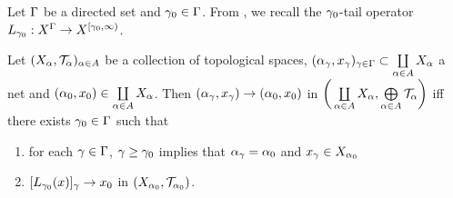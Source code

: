 \documentclass{book}
\begin{document}
	\begin{note}
		Let $\Gamma$ be a directed set and $\gamma_0 \in \Gamma$. From , we recall the $\gamma_0$-tail operator $L_{\gamma_0}: X^{\Gamma} \rightarrow X^{[\gamma_0, \infty)}$. 
	\end{note}

	\begin{ex} 
		Let $(X_{\alpha}, \mathcal{T}_{\alpha})_{\alpha \in A}$ be a collection of topological spaces, $(\alpha_{\gamma}, x_{\gamma})_{\gamma \in \Gamma} \subset \coprod\limits_{\alpha \in A} X_{\alpha}$ a net and $(\alpha_0, x_0) \in \coprod\limits_{\alpha \in A} X_{\alpha}$. Then $(\alpha_{\gamma}, x_{\gamma}) \rightarrow (\alpha_0, x_0)$ in $\bigg( \coprod\limits_{\alpha \in A} X_{\alpha}, \bigoplus\limits_{\alpha \in A} \mathcal{T}_{\alpha} \bigg)$ iff there exists $\gamma_0 \in \Gamma$ such that
		\begin{enumerate}
			\item for each $\gamma \in \Gamma$, $\gamma \geq \gamma_0$ implies that $\alpha_{\gamma} = \alpha_0$ and $x_{\gamma} \in X_{\alpha_0}$
			\item $[L_{\gamma_0}(x)]_{\gamma} \rightarrow x_0$ in $(X_{\alpha_0}, \mathcal{T}_{\alpha_0})$.
		\end{enumerate}
	\end{ex}
\end{document}
